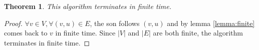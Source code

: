 \documentclass{article}
\newtheorem{theorem}{Theorem}
\begin{document}
\begin{theorem}This algorithm terminates in finite time.\end{theorem}
\begin{proof} $\forall v\in V, \forall (v,u)\in E$, the son follows $(v,u)$ and by lemma \ref{lemma:finite} comes back to $v$ in finite time. Since $|V|$ and $|E|$ are both finite, the algorithm terminates in finite time.

\end{proof}
\end{document}
